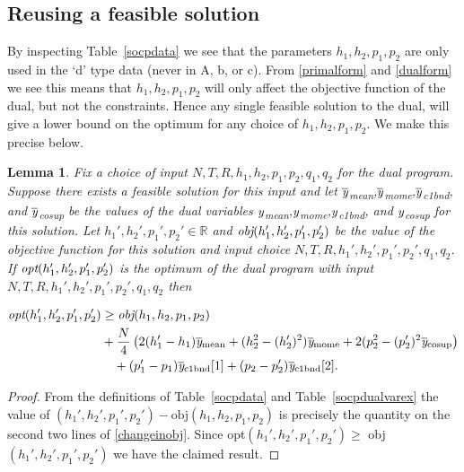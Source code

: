 \documentclass[12pt]{article}
\newtheorem{lemma}[theorem]{Lemma}
\newcommand{\ol}{\overline}
\numberwithin{equation}{section}
\begin{document}
\subsection{Reusing a feasible solution} 

By inspecting Table~\ref{socpdata} we see that the parameters $h_1,h_2,p_1,p_2$ are only used in the `d' type data (never in A, b, or c). From \eqref{primalform} and \eqref{dualform} we see this means that $h_1,h_2,p_1,p_2$ will only affect the objective function of the dual, but not the constraints. Hence any single feasible solution to the dual, will give a lower bound on the optimum for any choice of $h_1,h_2,p_1,p_2$. We make this precise below.


\begin{lemma}\label{reuselem} Fix a choice of input $N,T,R,h_1,h_2,p_1,p_2,q_1,q_2$ for the dual program. Suppose there exists a feasible solution for this input and let $\ol{\emph{y}}$\textsubscript{mean},$\ol{\emph{y}}$\textsubscript{mome},$\ol{\emph{y}}$\textsubscript{c1bnd}, and $\ol{\emph{y}}$\textsubscript{cosup} be the values of the dual variables ${\emph{y}}$\textsubscript{mean},${\emph{y}}$\textsubscript{mome},${\emph{y}}$\textsubscript{c1bnd}, and ${\emph{y}}$\textsubscript{cosup} for this solution. Let $h_1',h_2',p_1',p_2' \in \mathbb{R}$ and $\emph{obj}(h_1',h_2',p_1',p_2')$ be the value of the objective function for this solution and input choice $N,T,R,h_1',h_2',p_1',p_2',q_1,q_2$. If $\emph{opt}(h_1',h_2',p_1',p_2')$ is the optimum of the dual program with input $N,T,R,h_1',h_2',p_1',p_2',q_1,q_2$ then 

\begin{align} \emph{opt}(h_1',h_2',p_1',p_2') &  \geq \emph{obj}(h_1,h_2,p_1,p_2)\nonumber \\ 
& +\frac{N}{4} \left( 2(h_1'-h_1)\ol{\emph{y}}\textsubscript{mean} + (h_2^2-(h_2')^2)\ol{\emph{y}}\textsubscript{mome} + 2(p_2^2-(p_2')^2\ol{\emph{y}}\textsubscript{cosup}\right)\nonumber \\
  & \quad + (p_1'-p_1)\ol{\emph{y}}\textsubscript{c1bnd}[1] + (p_2-p_2')\ol{\emph{y}}\textsubscript{c1bnd}[2] . \label{changeinobj}\end{align}
\end{lemma}
\begin{proof} From the definitions of Table~\ref{socpdata} and Table~\ref{socpdualvarex} the value of $(h_1',h_2',p_1',p_2') - \text{obj}(h_1,h_2,p_1,p_2)$ is precisely the quantity on the second two lines of \eqref{changeinobj}. Since opt$(h_1',h_2',p_1',p_2') \geq $ obj$(h_1',h_2',p_1',p_2')$ we have the claimed result.

\end{proof}
\end{document}
